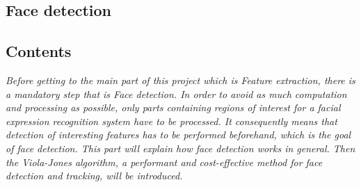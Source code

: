   \begin{titlepage}
    \vspace*{\fill}
      \part{Face detection}
    \vspace*{\fill}
  \end{titlepage}
  
\startcontents[parts]

\chapter*{Contents}

\textit{Before getting to the main part of this project which is Feature extraction, there is a mandatory step that is Face detection. In order to avoid as much computation and processing as possible, only parts containing regions of interest for a facial expression recognition system have to be processed. It consequently means that detection of interesting features has to be performed beforehand, which is the goal of face detection. This part will explain how face detection works in general. Then the Viola-Jones algorithm, a performant and cost-effective method for face detection and tracking, will be introduced.}

\vspace{\baselineskip}


\pagebreak


\newpage


\stopcontents[parts]


